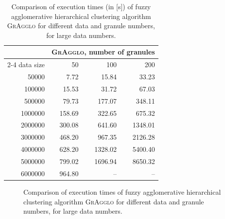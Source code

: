 \documentclass{amcs}
\newcommand{\procedura}[1]{\textsc{#1}}
\newcommand{\MojAlg}{\procedura{GrAgglo}}
\begin{document}
 \begin{table}
 	\centering
    \caption{Comparison of execution times (in [s]) of fuzzy agglomerative hierarchical clustering algorithm \MojAlg{} for different data and granule numbers, for large data numbers.}
 	\label{id:tab:comparing-times-large}
 	\begin{tabular}{rrrr}
 		\toprule
                & \multicolumn{3}{c}{\MojAlg, number of granules} \\
      \cmidrule(lr){2-4}
 		data size & 50  & 100  & 200   \\
 		\midrule
 		  50000 &   7.72 &   15.84 &   33.23 \\
		 100000 &  15.53 &   31.72 &   67.03 \\
		 500000 &  79.73 &  177.07 &  348.11 \\
		1000000 & 158.69 &  322.65 &  675.32 \\
		2000000 & 300.08 &  641.60 & 1348.01 \\
		3000000 & 468.20 &  967.35 & 2126.28 \\
		4000000 & 628.20 & 1328.02 & 5400.40 \\
		5000000 & 799.02 & 1696.94 & 8650.32 \\
		6000000 & 964.80 & -- & -- \\
 		\bottomrule
 	\end{tabular}
 \end{table}
\begin{figure}
 \centering
   \caption{Comparison of execution times of fuzzy agglomerative hierarchical clustering algorithm \MojAlg{} for different data and granule numbers, for large data numbers.}
 	\label{id:fig:comparing-times-large}
\end{figure}
\end{document}

